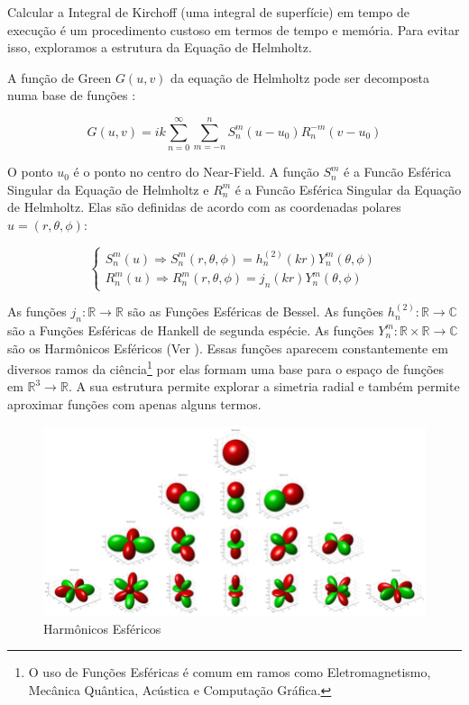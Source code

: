 Calcular a Integral de Kirchoff (uma integral de superfície) em tempo de execução é um procedimento custoso em termos de tempo e memória. Para evitar isso, exploramos a estrutura da Equação de Helmholtz.

A função de Green $G(u, v)$ da equação de Helmholtz pode ser decomposta numa base de funções \cite{gumerov2005fast}:

\begin{equation} \label{eq:helmholtz_expansion}
	G(u, v) = ik \sum_{n=0}^{\infty} \sum_{m=-n}^n S_n^m(u - u_0)R_n^{-m}(v - u_0)
\end{equation}

O ponto $u_0$ é o ponto no centro do Near-Field. A função $S_n^m$ é a Funcão Esférica Singular da Equação de Helmholtz e $R_n^m$ é a Funcão Esférica Singular da Equação de Helmholtz. Elas são definidas de acordo com as coordenadas polares $u = (r, \theta, \phi)$:

\begin{equation} \label{eq:helmholtz_basis_functions}
	\begin{cases}
		S_n^m(u) \Rightarrow S_n^m(r, \theta, \phi) = h_n^{(2)}(kr)Y_n^m(\theta, \phi)\\
		R_n^m(u) \Rightarrow R_n^m(r, \theta, \phi) = j_n(kr)Y_n^m(\theta, \phi)
	\end{cases}
\end{equation}

As funções $j_n : \mathbb{R}\rightarrow\mathbb{R}$ são as Funções Esféricas de Bessel. As funções $h_n^{(2)} : \mathbb{R}\rightarrow\mathbb{C}$ são a Funções Esféricas de Hankell de segunda espécie. As funções $Y_n^m : \mathbb{R}\times\mathbb{R}\rightarrow\mathbb{C}$ são os Harmônicos Esféricos (Ver ). Essas funções aparecem constantemente em diversos ramos da ciência\footnote{O uso de Funções Esféricas é comum em ramos como Eletromagnetismo, Mecânica Quântica, Acústica e Computação Gráfica.} por elas formam uma base para o espaço de funções em $\mathbb{R}^3 \rightarrow \mathbb{R}$. A sua estrutura permite explorar a simetria radial e também permite aproximar funções com apenas alguns termos.

\begin{figure}[ht]
	\centering
	\includegraphics[width=\textwidth]{algorithm/spherical_harmonics.png}
	\caption[Harmônicos Esféricos]{Harmônicos Esféricos}
	\label{fig:spherical_harmonics}
\end{figure}


